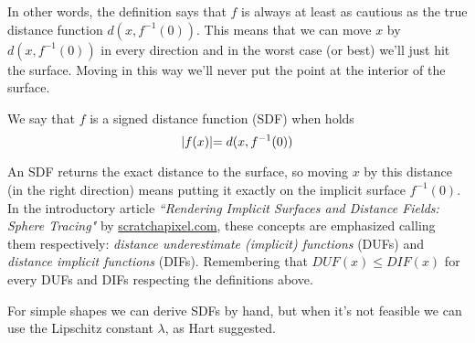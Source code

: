\noindent
In other words, the definition says that $f$ is always at least as cautious as the true distance function $d(x,f^{-1}(0))$.
This means that we can move $x$ by $d(x,f^{-1}(0))$ in every direction and in the worst case (or best) we'll just hit the surface.
Moving in this way we'll never put the point at the interior of the surface.

\begin{definition}
We say that $f$ is a signed distance function (SDF) when holds
\begin{equation}\label{eq:sdf}
\lvert f(x) \lvert = d(x,f^{-1}(0))
\end{equation}
\end{definition}

\noindent
An SDF returns the exact distance to the surface, so moving $x$ by this distance (in the right direction) means putting it exactly on the implicit surface $f^{-1}(0)$.
In the introductory article
\emph{``Rendering Implicit Surfaces and Distance Fields: Sphere Tracing"}\cite{scratch_sdf}
by \url{scratchapixel.com},
these concepts are emphasized calling them respectively: 
\emph{distance underestimate (implicit) functions} (DUFs) and 
\emph{distance implicit functions} (DIFs).
Remembering that $DUF(x) \leq DIF(x)$ for every DUFs and DIFs respecting the definitions above.


For simple shapes we can derive SDFs by hand, but when it's not feasible we can use the Lipschitz constant $\lambda$, as Hart\cite{hart1996} suggested.

